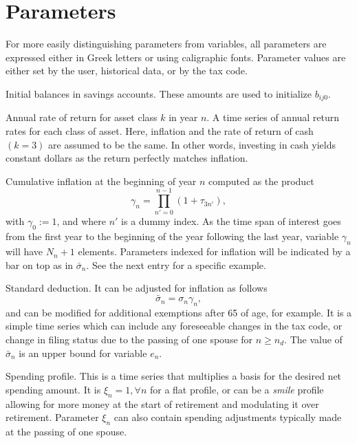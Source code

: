 \documentclass{report}[fleqn,11pt]
\begin{document}
\section{Parameters}
For more easily distinguishing parameters from variables, all parameters are expressed
either in Greek letters or using caligraphic fonts.
Parameter values are either set by the user, historical data, or by the tax code.
\begin{description}[leftmargin=4em,style=multiline]
\item [$\beta_{ij}$]
	Initial balances in savings accounts. These amounts are used to initialize $b_{ij0}$.
\item [$\tau_{kn}$]
	Annual rate of return for asset class $k$ in year $n$.
	A time series of annual return rates for each class of asset.
	Here, inflation and the rate of return of cash $(k=3)$ are assumed to be the same.
	In other words, investing in cash yields constant dollars as the return perfectly
	matches inflation.
\item [$\gamma_n$]
	Cumulative inflation at the beginning of year $n$ computed as the product
	\begin{equation}
		\gamma_n = \prod_{n' = 0}^{n-1} (1 + \tau_{3n'}),
	\end{equation}
	with $\gamma_0 := 1$, and where $n'$ is a dummy index.
	As the time span of interest goes from the first year to the beginning
        of the year following the last year,
        variable $\gamma_n$ will have $N_n + 1$ elements.
	Parameters indexed for inflation will be indicated by a bar on top as in $\bar{\sigma}_n$.
	See the next entry for a specific example.
\item [$\sigma_n$]
	Standard deduction. It can be adjusted for inflation as follows
	\begin{equation}
		\bar\sigma_n = \sigma_n \gamma_n,
	\end{equation}
	and can be modified for additional exemptions after 65 of age, for example.
	It is a simple time series
	which can include any foreseeable changes in the tax code, or change in filing status due to the
	passing of one spouse for $n\ge n_d$.  The value of $\bar{\sigma}_n$ is an upper bound for variable $e_n$.
\item [$\xi_{n}$]
	Spending profile. This is a time series that multiplies a basis for the desired net spending amount.
	It is $\xi_n =1, \forall n$ for
	a flat profile, or can be a {\em smile} profile allowing for more money at the start
	of retirement and modulating it over retirement. Parameter
	$\xi_n$ can also contain spending adjustments typically made at the passing of one spouse.

\end{description}
\end{document}
